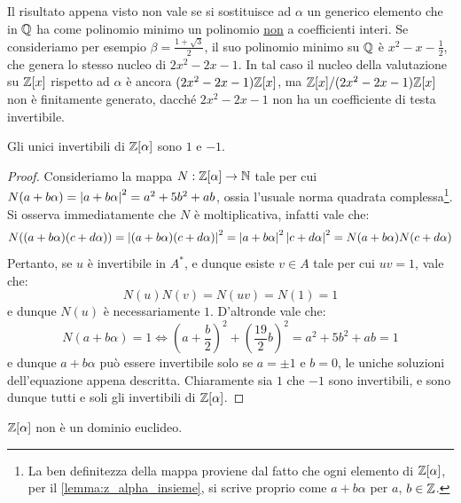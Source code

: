 \documentclass[11pt]{scrartcl}
\begin{document}
	\begin{remark}
		Il risultato appena visto non vale se si sostituisce ad $\alpha$ un
		generico elemento che in $\mathbb Q$ ha come polinomio minimo un polinomio
		\underline{non} a coefficienti interi. Se consideriamo per esempio $\beta = 
		\frac{1 + \sqrt{3}}{2}$,
		il suo polinomio minimo su $\mathbb Q$ è $x^2 - x - \frac 1 2$, che genera
		lo stesso nucleo di $2x^2 - 2x - 1$. In tal caso il nucleo della
		valutazione su $\mathbb Z[x]$ rispetto ad $\alpha$ è ancora
		$(2x^2 - 2x - 1) \mathbb Z[x]$, ma $\mathbb Z[x]/(2x^2 - 2x - 1)\mathbb Z[x]$ non
		è finitamente generato, dacché $2x^2 - 2x - 1$ non ha un coefficiente
		di testa invertibile.
	\end{remark}
	

	\begin{lemma}
		\label{lemma:z_alpha_invertibili}
		Gli unici invertibili di $\mathbb Z[\alpha]$ sono $1$ e $-1$.
	\end{lemma}
	
	\begin{proof}
		Consideriamo la mappa $N : \mathbb Z[\alpha] \to \mathbb N$ tale per
		cui $N(a + b \alpha) = \left\lvert a + b \alpha \right\rvert^2 = a^2 + 5 b^2 + ab$, ossia
		l'usuale norma quadrata complessa\footnote{
			La ben definitezza della mappa proviene dal fatto che ogni
			elemento di $\mathbb Z[\alpha]$, per il \autoref{lemma:z_alpha_insieme},
			si scrive proprio come $a + b \alpha$ per $a$, $b \in \mathbb Z$.
		}.
		Si osserva immediatamente che $N$ è moltiplicativa, infatti vale che:
		\[ N((a+b\alpha)(c+d\alpha)) = \left\lvert (a+b\alpha)(c+d\alpha) \right\rvert^2 = \left\lvert a+b\alpha \right\rvert^2 \left\lvert c+d\alpha \right\rvert^2 = N(a+b\alpha) N(c+d\alpha) \]
		Pertanto, se $u$ è invertibile in $A^*$, e dunque esiste $v \in A$ tale per
		cui $uv = 1$, vale che:
		\[ N(u) N(v) = N(uv) = N(1) = 1 \]
		e dunque $N(u)$ è necessariamente $1$. D'altronde vale che:
		\[ N(a+b\alpha) = 1 \iff \left( \!a + \frac{b}{2} \right)^2 + \left( \frac{19}{2} b\right)^2 = a^2 + 5 b^2 + ab = 1 \]
		e dunque $a+b\alpha$ può essere invertibile solo se $a = \pm 1$ e $b = 0$,
		le uniche soluzioni dell'equazione appena descritta. Chiaramente sia $1$ che
		$-1$ sono invertibili, e sono dunque tutti e soli gli invertibili di $\mathbb Z[\alpha]$.
	\end{proof}


	\begin{proposition}
		$\mathbb Z[\alpha]$ non è un dominio euclideo.
	\end{proposition}
	
\end{document}
